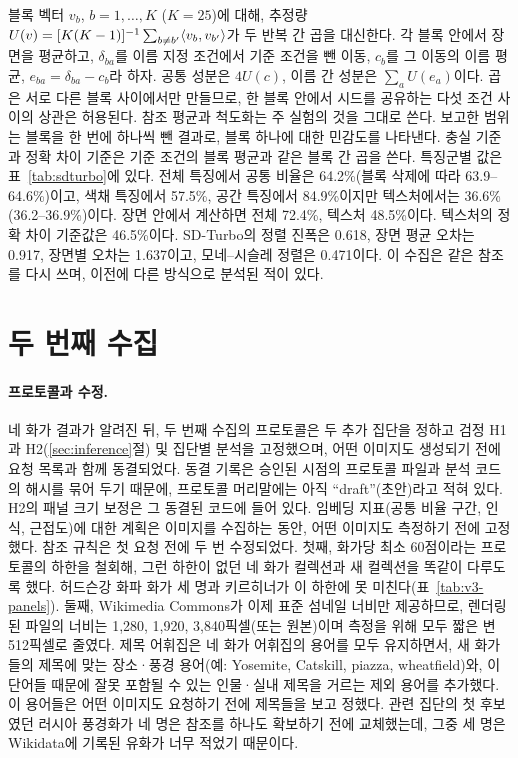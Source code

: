 블록 벡터 $v_b$, $b=1,\dots,K$ ($K=25$)에 대해, 추정량
$U(v)=[K(K-1)]^{-1}\sum_{b\ne b'}\langle v_b,v_{b'}\rangle$가 두 반복 간 곱을 대신한다. 각 블록 안에서 장면을
평균하고, $\delta_{ba}$를 이름 지정 조건에서 기준 조건을 뺀 이동, $c_b$를 그 이동의 이름 평균,
$e_{ba}=\delta_{ba}-c_b$라 하자. 공통 성분은 $4U(c)$, 이름 간 성분은 $\sum_aU(e_a)$이다. 곱은 서로 다른
블록 사이에서만 만들므로, 한 블록 안에서 시드를 공유하는 다섯 조건 사이의 상관은 허용된다. 참조 평균과
척도화는 주 실험의 것을 그대로 쓴다. 보고한 범위는 블록을 한 번에 하나씩 뺀 결과로, 블록 하나에 대한
민감도를 나타낸다. 충실 기준과 정확 차이 기준은 기준 조건의 블록 평균과 같은 블록 간 곱을 쓴다.
특징군별 값은 표~\ref{tab:sdturbo}에 있다. 전체 특징에서 공통 비율은 64.2\%(블록 삭제에 따라
63.9--64.6\%)이고, 색채 특징에서 57.5\%, 공간 특징에서 84.9\%이지만 텍스처에서는 36.6\%(36.2--36.9\%)이다.
장면 안에서 계산하면 전체 72.4\%, 텍스처 48.5\%이다. 텍스처의 정확 차이 기준값은 46.5\%이다. SD-Turbo의
정렬 진폭은 0.618, 장면 평균 오차는 0.917, 장면별 오차는 1.637이고, 모네--시슬레 정렬은 0.471이다. 이
수집은 같은 참조를 다시 쓰며, 이전에 다른 방식으로 분석된 적이 있다.



\FloatBarrier
\section{두 번째 수집}\label{app:second}

\paragraph{프로토콜과 수정.} 네 화가 결과가 알려진 뒤, 두 번째 수집의 프로토콜은 두 추가 집단을 정하고
검정 H1과 H2(\ref{sec:inference}절) 및 집단별 분석을 고정했으며, 어떤 이미지도 생성되기 전에 요청
목록과 함께 동결되었다. 동결 기록은 승인된 시점의 프로토콜 파일과 분석 코드의 해시를 묶어 두기 때문에,
프로토콜 머리말에는 아직 ``draft''(초안)라고 적혀 있다. H2의 패널 크기 보정은 그 동결된 코드에 들어
있다. 임베딩 지표(공통 비율 구간, 인식, 근접도)에 대한 계획은 이미지를 수집하는 동안, 어떤 이미지도
측정하기 전에 고정했다. 참조 규칙은 첫 요청 전에 두 번 수정되었다. 첫째, 화가당 최소 60점이라는
프로토콜의 하한을 철회해, 그런 하한이 없던 네 화가 컬렉션과 새 컬렉션을 똑같이 다루도록 했다. 허드슨강
화파 화가 세 명과 키르히너가 이 하한에 못 미친다(표~\ref{tab:v3-panels}). 둘째, Wikimedia Commons가
이제 표준 섬네일 너비만 제공하므로, 렌더링된 파일의 너비는 1,280, 1,920, 3,840픽셀(또는 원본)이며
측정을 위해 모두 짧은 변 512픽셀로 줄였다. 제목 어휘집은 네 화가 어휘집의 용어를 모두 유지하면서, 새
화가들의 제목에 맞는 장소·풍경 용어(예: Yosemite, Catskill, piazza, wheatfield)와, 이 단어들 때문에
잘못 포함될 수 있는 인물·실내 제목을 거르는 제외 용어를 추가했다. 이 용어들은 어떤 이미지도 요청하기
전에 제목들을 보고 정했다. 관련 집단의 첫 후보였던 러시아 풍경화가 네 명은 참조를 하나도 확보하기 전에
교체했는데, 그중 세 명은 Wikidata에 기록된 유화가 너무 적었기 때문이다.

